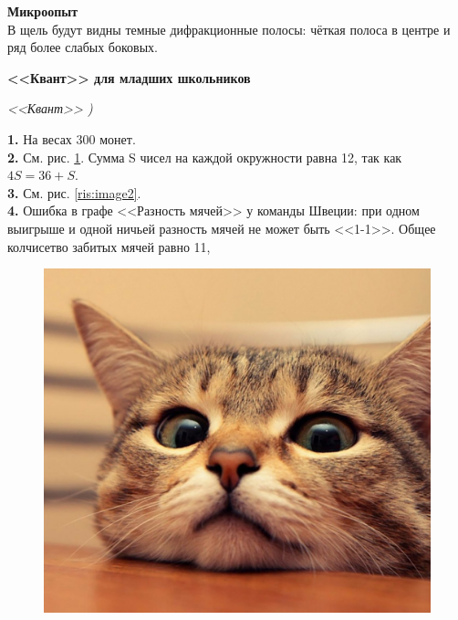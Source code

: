 \begin{multicols*}{2}
	\noindent \textbf{Микроопыт}\\
	В щель будут видны темные дифракционные полосы: чёткая полоса в центре и ряд более слабых боковых.\vspace{1cm}
	
	\noindent \textbf{<<Квант>> для младших школьников} 
	
	\textit{<<Квант>> )} \vspace{2mm}
	
	\begin{spacing}{0.9}
	\noindent \textbf{1.} На весах 300 монет. \\
	
	\noindent \textbf{2.} См. рис. \ref{ris:image1}. Сумма S чисел на каждой окружности равна 12, так как $4S=36+S$. \\
	\textbf{3.} См. рис. \ref{ris:image2}. \\
	\textbf{4.} Ошибка в графе <<Разность мячей>> у команды Швеции: при одном выигрыше и одной ничьей разность мячей не может быть <<1-1>>. Общее колчисетво забитых мячей равно 11,\\
	\end{spacing}	


	\begin{figure}[H]     
		\begin{minipage}[h]{0.49\linewidth}
			
			{\includegraphics[width=0.9\linewidth]{cat.jpg}}	
			\caption{}
			\label{ris:image1} 
			
		\end{minipage}     
		\hfill
		\begin{minipage}[h]{0.49\linewidth}     
	

\end{minipage}
\end{figure}
\end{multicols*}

